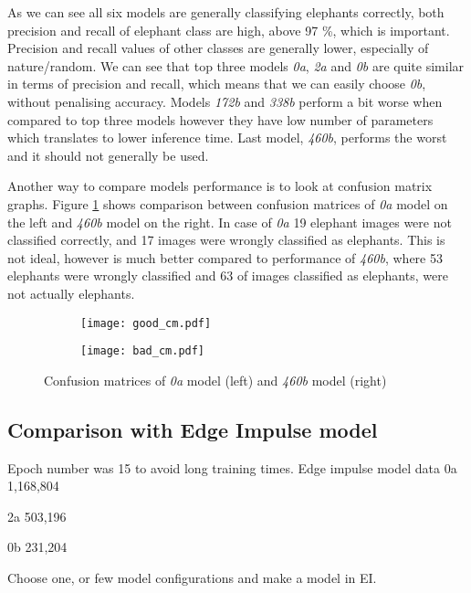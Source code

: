 As we can see all six models are generally classifying elephants correctly, both precision and recall of elephant class are high, above 97 \%, which is important.
Precision and recall values of other classes are generally lower, especially of nature/random.
We can see that top three models \textit{0a}, \textit{2a} and \textit{0b} are quite similar in terms of precision and recall, which means that we can easily choose \textit{0b}, without penalising accuracy. 
Models \textit{172b} and \textit{338b} perform a bit worse when compared to top three models however they have low number of parameters which translates to lower inference time.
Last model, \textit{460b}, performs the worst and it should not generally be used.

Another way to compare models performance is to look at confusion matrix graphs.
Figure \ref{double_cm} shows comparison between confusion matrices of \textit{0a} model on the left and \textit{460b} model on the right.
In case of \textit{0a} 19 elephant images were not classified correctly, and 17 images were wrongly classified as elephants.
This is not ideal, however is much better compared to performance of \textit{460b}, where 53 elephants were wrongly classified and 63 of images classified as elephants, were not actually elephants.

\begin{figure}[ht]
    \begin{subfigure}{0.5\textwidth}
        \centering
        \texttt{[image: good\_cm.pdf]} 
    \end{subfigure}
    \begin{subfigure}{0.5\textwidth}
        \centering
        \texttt{[image: bad\_cm.pdf]}
    \end{subfigure}
    \caption{Confusion matrices of \textit{0a} model (left) and \textit{460b} model (right)}
    \label{double_cm}
\end{figure}


\subsection{ Comparison with Edge Impulse model}

Epoch number was 15 to avoid long training times.
Edge impulse model data
0a
1,168,804

2a
503,196

0b
231,204


Choose one, or few model configurations and make a model in EI.

